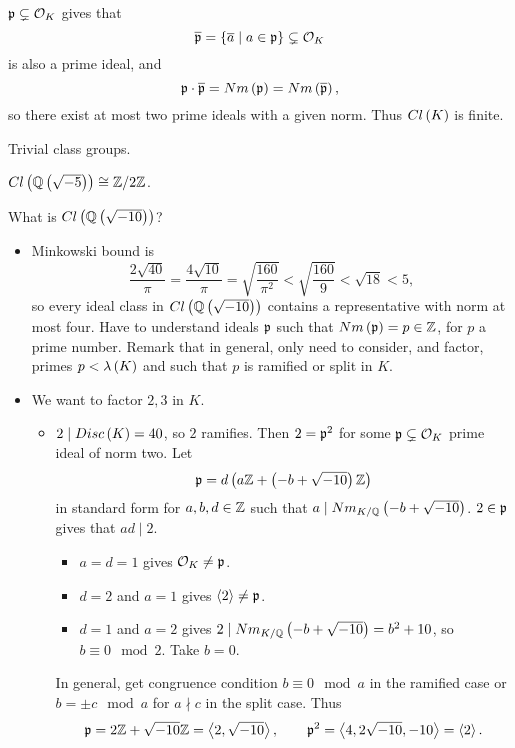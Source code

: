 \begin{note*}
$ \mathfrak{p} \subsetneq \mathcal{O}_K $ gives that
$$ \overline{\mathfrak{p}} = \left\{ \overline{a} \mid a \in \mathfrak{p} \right\} \subsetneq \mathcal{O}_K $$
is also a prime ideal, and
$$ \mathfrak{p} \cdot \overline{\mathfrak{p}} = Nm\left( \mathfrak{p} \right) = Nm\left( \overline{\mathfrak{p}} \right), $$
so there exist at most two prime ideals with a given norm. Thus $ Cl\left( K \right) $ is finite.
\end{note*}

\begin{example*}
Trivial class groups.
\end{example*}

\begin{example*}
$ Cl\left( \mathbb{Q}\left( \sqrt{-5} \right) \right) \cong \mathbb{Z} / 2\mathbb{Z} $.
\end{example*}

\begin{example*}
What is $ Cl\left( \mathbb{Q}\left( \sqrt{-10} \right) \right) $?
\begin{itemize}
\item Minkowski bound is
$$ \dfrac{2\sqrt{40}}{\pi} = \dfrac{4\sqrt{10}}{\pi} = \sqrt{\dfrac{160}{\pi^2}} < \sqrt{\dfrac{160}{9}} < \sqrt{18} < 5, $$
so every ideal class in $ Cl\left( \mathbb{Q}\left( \sqrt{-10} \right) \right) $ contains a representative with norm at most four. Have to understand ideals $ \mathfrak{p} $ such that $ Nm\left( \mathfrak{p} \right) = p \in \mathbb{Z} $, for $ p $ a prime number. Remark that in general, only need to consider, and factor, primes $ p < \lambda\left( K \right) $ and such that $ p $ is ramified or split in $ K $.
\item We want to factor $ 2, 3 $ in $ K $.
\begin{itemize}
\item $ 2 \mid Disc\left( K \right) = 40 $, so $ 2 $ ramifies. Then $ 2 = \mathfrak{p}^2 $ for some $ \mathfrak{p} \subsetneq \mathcal{O}_K $ prime ideal of norm two. Let
$$ \mathfrak{p} = d\left( a\mathbb{Z} + \left( -b + \sqrt{-10} \right)\mathbb{Z} \right) $$
in standard form for $ a, b, d \in \mathbb{Z} $ such that $ a \mid Nm_{K / \mathbb{Q}}\left( -b + \sqrt{-10} \right) $. $ 2 \in \mathfrak{p} $ gives that $ ad \mid 2 $.
\begin{itemize}
\item $ a = d = 1 $ gives $ \mathcal{O}_K \ne \mathfrak{p} $.
\item $ d = 2 $ and $ a = 1 $ gives $ \left\langle 2 \right\rangle \ne \mathfrak{p} $.
\item $ d = 1 $ and $ a = 2 $ gives $ 2 \mid Nm_{K / \mathbb{Q}}\left( -b + \sqrt{-10} \right) = b^2 + 10 $, so $ b \equiv 0 \mod 2 $. Take $ b = 0 $.
\end{itemize}
In general, get congruence condition $ b \equiv 0 \mod a $ in the ramified case or $ b = \pm c \mod a $ for $ a \nmid c $ in the split case. Thus
$$ \mathfrak{p} = 2\mathbb{Z} + \sqrt{-10}\mathbb{Z} = \left\langle 2, \sqrt{-10} \right\rangle, \qquad \mathfrak{p}^2 = \left\langle 4, 2\sqrt{-10}, -10 \right\rangle = \left\langle 2 \right\rangle. $$

\end{itemize}
\end{itemize}
\end{example*}
